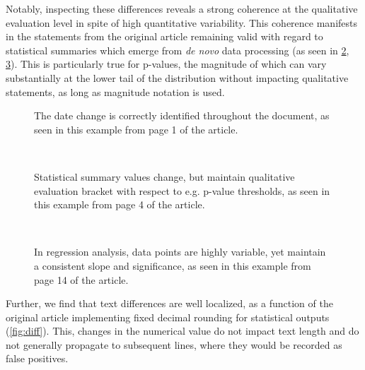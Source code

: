 Notably, inspecting these differences reveals a strong coherence at the qualitative evaluation level in spite of high quantitative variability.
This coherence manifests in the statements from the original article remaining valid with regard to statistical summaries which emerge from  \textit{de novo} data processing (as seen in \ref{fig:diff_text}, \ref{fig:diff_fig}).
This is particularly true for p-values, the magnitude of which can vary substantially at the lower tail of the distribution without impacting qualitative statements, as long as magnitude notation is used.

\begin{figure*}
	\centering
	\begin{subfigure}{0.99\textwidth}
		\centering
		\caption{
			The date change is correctly identified throughout the document, as seen in this example from page 1 of the article.
		}
		\label{fig:diff_date}
	\end{subfigure}
	\\
	\begin{subfigure}{0.99\textwidth}
		\centering
		\caption{
			Statistical summary values change, but maintain qualitative evaluation bracket with respect to e.g. p-value thresholds, as seen in this example from page 4 of the article.
		}
		\label{fig:diff_text}
	\end{subfigure}
	\\
	\vspace{1em}
	\begin{subfigure}{0.99\textwidth}
		\centering
		\caption{
			In regression analysis, data points are highly variable, yet maintain a consistent slope and significance, as seen in this example from page 14 of the article.
		}
		\label{fig:diff_fig}
	\end{subfigure}
	\caption{
		\textbf{The article difference showcases expected quantitative and metadata variability, while maintaining overall validity of qualitative statements.}
		The figures are extracted from a full article \texttt{diff}, with tinted highlighting (blue for the Historical Manuscript Record, and orange for the New Reexecution Model result).
	}
	\label{fig:diff}
\end{figure*}

Further, we find that text differences are well localized, as a function of the original article implementing fixed decimal rounding for statistical outputs (\cref{fig:diff}).
This, changes in the numerical value do not impact text length and do not generally propagate to subsequent lines, where they would be recorded as false positives.

